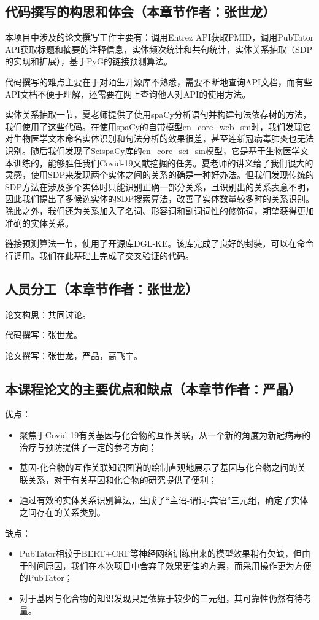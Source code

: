 \documentclass[twocolumn]{article}
\begin{document}
\subsection{代码撰写的构思和体会（本章节作者：张世龙）}
本项目中涉及的论文撰写工作主要有：调用Entrez API获取PMID，调用PubTator API获取标题和摘要的注释信息，实体频次统计和共句统计，实体关系抽取（SDP的实现和扩展），基于PyG的链接预测算法。\par
代码撰写的难点主要在于对陌生开源库不熟悉，需要不断地查询API文档，而有些API文档不便于理解，还需要在网上查询他人对API的使用方法。\par
实体关系抽取一节，夏老师提供了使用spaCy分析语句并构建句法依存树的方法，我们使用了这些代码。在使用spaCy的自带模型en\_core\_web\_sm时，我们发现它对生物医学文本命名实体识别和句法分析的效果很差，甚至连新冠病毒肺炎也无法识别。随后我们发现了ScispaCy库的en\_core\_sci\_sm模型，它是基于生物医学文本训练的，能够胜任我们Covid-19文献挖掘的任务。夏老师的讲义给了我们很大的灵感，使用SDP来发现两个实体之间的关系的确是一种好办法。但我们发现传统的SDP方法在涉及多个实体时只能识别正确一部分关系，且识别出的关系表意不明，因此我们提出了多候选实体的SDP搜索算法，改善了实体数量较多时的关系识别。除此之外，我们还为关系加入了名词、形容词和副词词性的修饰词，期望获得更加准确的实体关系。\par
链接预测算法一节，使用了开源库DGL-KE。该库完成了良好的封装，可以在命令行调用。我们在此基础上完成了交叉验证的代码。\par

\subsection{人员分工（本章节作者：张世龙）}
论文构思：共同讨论。\par
代码撰写：张世龙。\par
论文撰写：张世龙，严晶，高飞宇。\par

\subsection{本课程论文的主要优点和缺点（本章节作者：严晶）}
优点：\par
\begin{itemize}
	\item 聚焦于Covid-19有关基因与化合物的互作关联，从一个新的角度为新冠病毒的治疗与预防提供了一定的参考方向；
	\item 基因-化合物的互作关联知识图谱的绘制直观地展示了基因与化合物之间的关联关系，对于有关基因和化合物的研究提供了便利；
	\item 通过有效的实体关系识别算法，生成了“主语-谓词-宾语”三元组，确定了实体之间存在的关系类别。
\end{itemize}\par
缺点：\par
\begin{itemize}
	\item PubTator相较于BERT+CRF等神经网络训练出来的模型效果稍有欠缺，但由于时间原因，我们在本次项目中舍弃了效果更佳的方案，而采用操作更为方便的PubTator；
	\item 对于基因与化合物的知识发现只是依靠于较少的三元组，其可靠性仍然有待考量。
\end{itemize}\par
\end{document}

